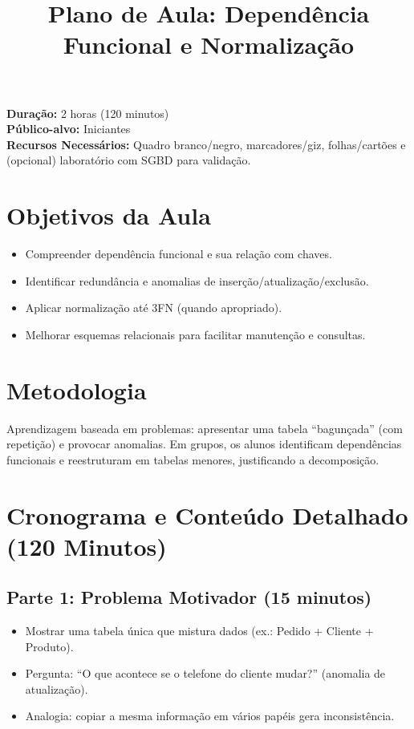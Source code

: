\documentclass[12pt,a4paper]{article}
\title{Plano de Aula: Dependência Funcional e Normalização}
\date{}
\begin{document}
\maketitle

\noindent
\textbf{Duração:} 2 horas (120 minutos)\\
\textbf{Público-alvo:} Iniciantes\\
\textbf{Recursos Necessários:} Quadro branco/negro, marcadores/giz, folhas/cartões e (opcional) laboratório com SGBD para validação.

\section{Objetivos da Aula}
\begin{itemize}[leftmargin=*,itemsep=0.25em]
  \item Compreender dependência funcional e sua relação com chaves.
  \item Identificar redundância e anomalias de inserção/atualização/exclusão.
  \item Aplicar normalização até 3FN (quando apropriado).
  \item Melhorar esquemas relacionais para facilitar manutenção e consultas.
\end{itemize}

\section{Metodologia}
Aprendizagem baseada em problemas: apresentar uma tabela ``bagunçada'' (com repetição) e provocar anomalias. Em grupos, os alunos identificam dependências funcionais e reestruturam em tabelas menores, justificando a decomposição.

\section{Cronograma e Conteúdo Detalhado (120 Minutos)}
\subsection*{Parte 1: Problema Motivador (15 minutos)}
\begin{itemize}[leftmargin=*,itemsep=0.35em]
  \item Mostrar uma tabela única que mistura dados (ex.: Pedido + Cliente + Produto).
  \item Pergunta: ``O que acontece se o telefone do cliente mudar?'' (anomalia de atualização).
  \item Analogia: copiar a mesma informação em vários papéis gera inconsistência.
\end{itemize}
\end{document}
